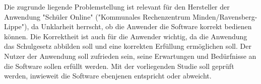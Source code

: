 Die zugrunde liegende Problemstellung ist relevant für den Hersteller der Anwendung "Schüler Online" ("Kommunales Rechenzentrum Minden/Ravensberg-Lippe"), da Unklarheit herrscht, ob die Anwender die Software korrekt bedienen können. Die Korrektheit ist auch für die Anwender wichtig, da die Anwendung das Schulgesetz abbilden soll und eine korrekten Erfüllung ermöglichen soll. Der Nutzer der Anwendung soll zufrieden sein, seine Erwartungen und Bedürfnisse an die Software sollen erfüllt werden. Mit der vorliegenden Studie soll geprüft werden, inwieweit die Software ebenjenen entspricht oder abweicht.
